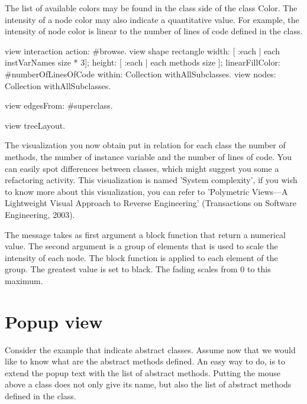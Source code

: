 \documentclass[a4paper,10pt,twoside]{book}
\begin{document}
The list of available colors may be found in the class side of the class Color. The intensity of a node color may also indicate a quantitative value. For example, the intensity of node color is linear to the number of lines of code defined in the class.

\begin{code}{}
view interaction action: #browse.
view shape rectangle
  width: [ :each | each instVarNames size * 3];
  height: [ :each | each methods size ];
  linearFillColor: #numberOfLinesOfCode within: Collection withAllSubclasses.
view nodes: Collection withAllSubclasses.

view edgesFrom: #superclass.

view treeLayout.
\end{code}

The visualization you now obtain put in relation for each class the number of methods, the number of instance variable and the number of lines of code. You can easily spot differences between classes, which might suggest you some a refactoring activity. This visualization is named 'System complexity', if you wish to know more about this visualization, you can refer to 'Polymetric Views---A Lightweight Visual Approach to Reverse Engineering' (Transactions on Software Engineering, 2003). 

 The message  takes as first argument a block function that return a numerical value. The second argument is a group of elements that is used to scale the intensity of each node. The block function is applied to each element of the group. The greatest value is set to black. The fading scales from 0 to this maximum.

\section{Popup view}

Consider the example that indicate abstract classes. Assume now that we would like to know what are the abstract methods defined. An easy way to do, is to extend the popup text with the list of abstract methods. Putting the mouse above a class does not only give its name, but also the list of abstract methods defined in the class.

\end{document}
